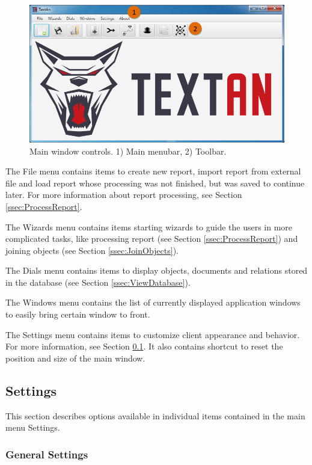\begin{figure}[!htb]
        \centering
        \includegraphics[width=\textwidth]{Images/main}
        \caption{Main window controls. 1) Main menubar, 2) Toolbar.}
        \label{fig:MainWindow}
\end{figure}

The File menu contains items to create new report, import report from external
file and load report whose processing was not finished, but was saved to continue
later. For more information about report processing, see Section \ref{ssec:ProcessReport}.

The Wizards menu contains items starting wizards to guide the users in more
complicated tasks, like processing report (see Section \ref{ssec:ProcessReport})
and joining objects (see Section \ref{ssec:JoinObjects}).

The Dials menu contains items to display objects, documents and relations
stored in the database (see Section \ref{ssec:ViewDatabase}).

The Windows menu contains the list of currently displayed application windows
to easily bring certain window to front.

The Settings menu contains items to customize \textan{} client appearance and
behavior. For more information, see Section \ref{ssec:Settings}. It also
contains shortcut to reset the position and size of the main window.

\subsection{Settings}
\label{ssec:Settings}

This section describes options available in individual items contained in the
main menu Settings.

\subsubsection{General Settings}
\label{sssec:GeneralSettings}

